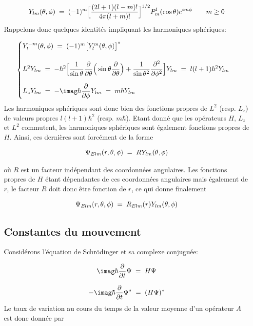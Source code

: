 \[
    Y_{lm}(\theta, \phi) \; = \; (-1)^m \Big[ \dfrac{(2l+1)(l-m)!}{4\pi(l+m)!}\Big]^{1/2} P^{l}_{m}(\cos{\theta})e^{im\phi} \qquad m\ge0
\]
Rappelons donc quelques identités impliquant les harmoniques sphériques:

\[
\begin{cases}
    Y_{l}^{-m}(\theta, \phi)\eq (-1)^m\big[Y_{l}^{m}(\theta, \phi)\big]^{*} \\[5mm]

    L^2Y_{lm}\eq-\hbar^2 \Big[\dfrac{1}{\sin{\theta}}\dfrac{\partial}{\partial\theta}\Big(\sin{\theta}\dfrac{\partial}{\partial\theta}\Big)+\dfrac{1}{\sin{\theta}^2}\dfrac{\partial^2}{\partial\phi^2}\Big]Y_{lm}\eq l(l+1)\hbar^2Y_{lm} \\[5mm]

    L_zY_{lm}\eq-\imag\hbar\dfrac{\partial}{\partial\phi}Y_{lm}\eq m\hbar Y_{lm}
\end{cases}
\]
Les harmoniques sphériques sont donc bien des fonctions propres de $L^2$ (resp. $L_z$) de valeurs propres $l(l+1)\hbar^2$ (resp. $m\hbar$). Etant donné que les opérateurs $H$, $L_z$ et $L^2$ commutent, les harmoniques sphériques sont également fonctions propres de $H$. Ainsi, ces dernières sont forcément de la forme

\[
    \Psi_{Elm}(r,\theta,\phi)\; = \; R Y_{lm}(\theta,\phi)
\]

où $R$ est un facteur indépendant des coordonnées angulaires. Les fonctions propres de $H$ étant dépendantes de ces coordonnées angulaires mais également de $r$, le facteur $R$ doit donc être fonction de $r$, ce qui donne finalement

\begin{equation}
    \Psi_{Elm}(r,\theta,\phi)\; = \; R_{Elm}(r) Y_{lm}(\theta,\phi)
    \label{decompopsi}
\end{equation}

\subsection{Constantes du mouvement}
Considérons l'équation de Schrödinger et sa complexe conjuguée:

\[
    \imag \hbar \dfrac{\partial}{\partial t} \Psi \eq H \Psi
\]

\[
    -\imag \hbar \dfrac{\partial}{\partial t} \Psi ^{*}\eq (H \Psi)^{*}
\]
Le taux de variation au cours du temps de la valeur moyenne d'un opérateur $A$ est donc donnée par

